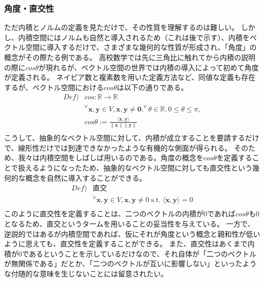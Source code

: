 \documentclass[10pt]{ujarticle}
\begin{document}
\subsubsection{角度・直交性}
ただ内積とノルムの定義を見ただけで、その性質を理解するのは難しい。
しかし、内積空間にはノルムも自然と導入されるため（これは後で示す）、内積をベクトル空間に導入するだけで、さまざまな幾何的な性質が形成され、「角度」の概念がその際たる例である。
高校数学では先に三角比に触れてから内積の説明の際に$cos\theta$が現れるが、ベクトル空間の世界では内積の導入によって初めて角度が定義される。
ネイピア数と複素数を用いた定義方法など、同値な定義も存在するが、ベクトル空間における$cos\theta$は以下の通りである。
$$
\begin{aligned}
  Def)&cos:\mathbb{R}\rightarrow\mathbb{R}\\
  &^\forall\mathbf{x},\mathbf{y}\in V,\mathbf{x},\mathbf{y}\neq\mathbf{0},^\forall\theta\in\mathbb{R},0\leq\theta\leq\pi,\\
  &cos\theta:=\frac{\langle\mathbf{x},\mathbf{y}\rangle}{\|\mathbf{x}\|\|\mathbf{y}\|}\\
\end{aligned}
$$
こうして、抽象的なベクトル空間に対して、内積が成立することを要請するだけで、線形性だけでは到達できなかったような有機的な側面が得られる。
そのため、我々は内積空間をしばしば用いるのである。角度の概念を$cos\theta$を定義することで扱えるようになったため、抽象的なベクトル空間に対しても直交性という幾何的な概念を自然に導入することができる。
$$
\begin{aligned}
  Def)&\text{直交}\\
  &^\forall\mathbf{x},\mathbf{y}\in V,\mathbf{x},\mathbf{y}\neq0\;\text{s.t.}\;\langle\mathbf{x},\mathbf{y}\rangle=0\\
\end{aligned}
$$
このように直交性を定義することは、二つのベクトルの内積が0であれば$cos\theta$も0となるため、直交というタームを用いることの妥当性を与えている。
一方で、逆説的ではあるが内積空間であれば、仮にそれが角度という概念と親和性が低いように思えても、直交性を定義することができる。
また、直交性はあくまで内積が0であるということを示しているだけなので、それ自体が「二つのベクトルが無関係である」だとか、「二つのベクトルが互いに影響しない」といったような付随的な意味を生じないことには留意されたい。
\end{document}
